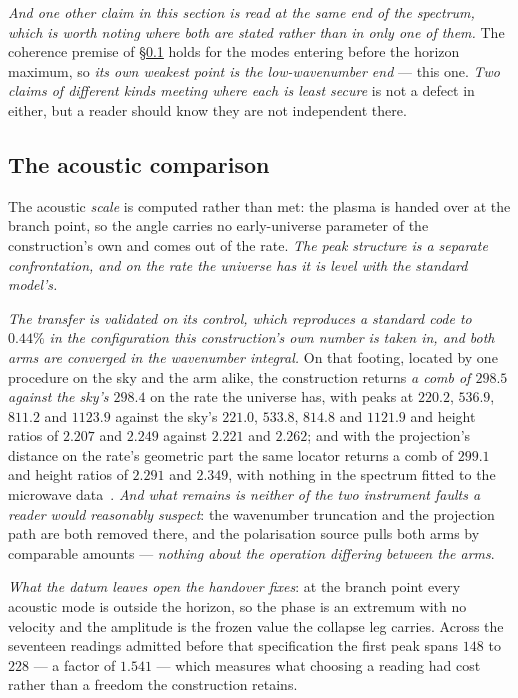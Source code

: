 \documentclass[11pt,a4paper]{article}
\theoremstyle{plain}
\theoremstyle{definition}
\begin{document}
\emph{And one other claim in this section is read at the same end of the spectrum, which is worth noting
where both are stated rather than in only one of them.} The coherence premise of \S\ref{sec:acoustic} holds
for the modes entering before the horizon maximum, so \emph{its own weakest point is the
low-wavenumber end} --- this one. \emph{Two claims of different kinds meeting where each is least secure} is
not a defect in either, but a reader should know they are not independent there.

\subsection{The acoustic comparison}\label{sec:acoustic}

The acoustic \emph{scale} is computed rather than met: the plasma is handed over at the branch point, so the
angle carries no early-universe parameter of the construction's own and comes out of the rate. \emph{The peak structure is a separate
confrontation, and on the rate the universe has it is level with the standard model's.}

\emph{The transfer is validated on its control, which reproduces a standard code to $0.44\%$ in the
configuration this construction's own number is taken in, and both arms are converged in the wavenumber
integral.} On that footing, located by one procedure on the sky and the arm alike, the construction returns \emph{a comb of $298.5$ against the sky's $298.4$} on the rate the universe has, with peaks at $220.2$, $536.9$, $811.2$ and $1123.9$ against the sky's $221.0$, $533.8$, $814.8$ and $1121.9$ and height ratios of $2.207$ and $2.249$ against $2.221$ and $2.262$; and with the projection's distance on the rate's geometric part the same locator returns a comb of $299.1$ and height ratios of $2.291$ and $2.349$, with nothing in the spectrum fitted to the microwave data~\cite{JanzenCRcosmology}. \emph{And what remains is neither of the two instrument faults a reader would
reasonably suspect}: the wavenumber truncation and the projection path are both removed there, and the
polarisation source pulls both arms by comparable amounts --- \emph{nothing about the operation differing
between the arms}.

\emph{What the datum leaves open the handover fixes}: at the branch point every acoustic mode is outside the
horizon, so the phase is an extremum with no velocity and the amplitude is the frozen value the collapse leg
carries. Across the seventeen readings admitted before that specification the first peak spans $148$ to $228$
--- a factor of $1.541$ --- which measures what choosing a reading had cost rather than a freedom the
construction retains.
\end{document}
